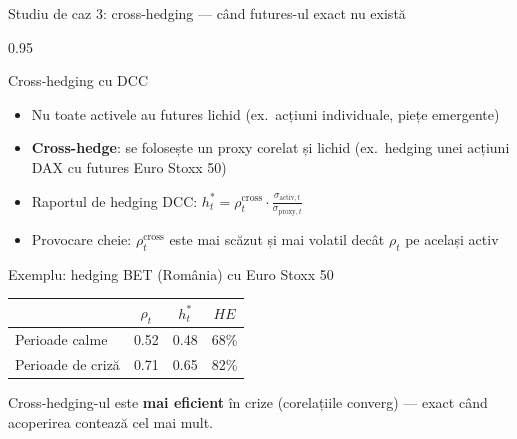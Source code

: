 \documentclass[9pt, aspectratio=169, t]{beamer}
\begin{document}
\begin{frame}{Studiu de caz 3: cross-hedging --- când futures-ul exact nu există}
    \begin{cminipage}{0.95\textwidth}
    {\footnotesize
    \begin{block}{Cross-hedging cu DCC}
        \begin{itemize}\setlength{\itemsep}{1pt}
            \item Nu toate activele au futures lichid (ex.\ acțiuni individuale, piețe emergente)
            \item \textbf{Cross-hedge}: se folosește un proxy corelat și lichid (ex.\ hedging unei acțiuni DAX cu futures Euro Stoxx 50)
            \item Raportul de hedging DCC: $h_t^* = \rho_t^{\text{cross}} \cdot \frac{\sigma_{\text{activ},t}}{\sigma_{\text{proxy},t}}$
            \item Provocare cheie: $\rho_t^{\text{cross}}$ este mai scăzut și mai volatil decât $\rho_t$ pe același activ
        \end{itemize}
    \end{block}
    \begin{exampleblock}{Exemplu: hedging BET (România) cu Euro Stoxx 50}
        {\small
        \begin{center}
        \begin{tabular}{l|ccc}
            \hline
            & $\rho_t$ & $h_t^*$ & $HE$ \\
            \hline
            Perioade calme    & 0.52 & 0.48 & 68\% \\
            Perioade de criză & 0.71 & 0.65 & 82\% \\
            \hline
        \end{tabular}
        \end{center}
        }
        Cross-hedging-ul este \textbf{mai eficient} în crize (corelațiile converg) --- exact când acoperirea contează cel mai mult.
    \end{exampleblock}
    }
    \end{cminipage}
\end{frame}
\end{document}
